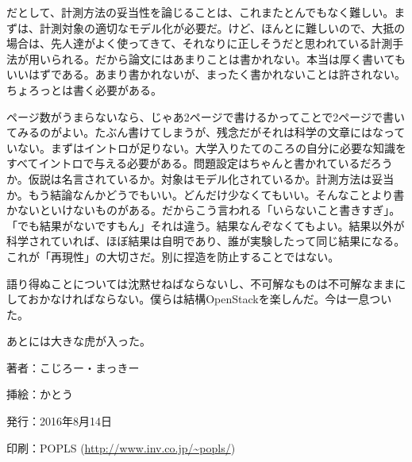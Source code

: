 \documentclass[9pt,b5paper,tombo,openany]{jsbook}
\begin{document}
だとして、計測方法の妥当性を論じることは、これまたとんでもなく難しい。まずは、計測対象の適切なモデル化が必要だ。けど、ほんとに難しいので、大抵の場合は、先人達がよく使ってきて、それなりに正しそうだと思われている計測手法が用いられる。だから論文にはあまりことは書かれない。本当は厚く書いてもいいはずである。あまり書かれないが、まったく書かれないことは許されない。ちょろっとは書く必要がある。

ページ数がうまらないなら、じゃあ2ページで書けるかってことで2ページで書いてみるのがよい。たぶん書けてしまうが、残念だがそれは科学の文章にはなっていない。まずはイントロが足りない。大学入りたてのころの自分に必要な知識をすべてイントロで与える必要がある。問題設定はちゃんと書かれているだろうか。仮説は名言されているか。対象はモデル化されているか。計測方法は妥当か。もう結論なんかどうでもいい。どんだけ少なくてもいい。そんなことより書かないといけないものがある。だからこう言われる「いらないこと書きすぎ」。「でも結果がないですもん」それは違う。結果なんぞなくてもよい。結果以外が科学されていれば、ほぼ結果は自明であり、誰が実験したって同じ結果になる。これが「再現性」の大切さだ。別に捏造を防止することではない。

語り得ぬことについては沈黙せねばならないし、不可解なものは不可解なままにしておかなければならない。僕らは結構OpenStackを楽しんだ。今は一息ついた。

あとには大きな虎が入った。

\thispagestyle{empty}
\begin{minipage}{0.5\paperwidth}
	\begin{description}
		\item{著者：}こじろー・まっきー
		\item{挿絵：}かとう
		\item{発行：}2016年8月14日
		\item{印刷：}POPLS (\url{http://www.inv.co.jp/~popls/})
	\end{description}
\end{minipage}
\end{document}
